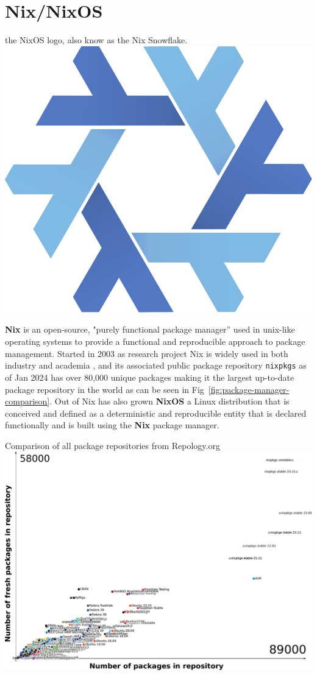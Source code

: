 \section{Nix/NixOS}

\begin{figureBox}[label={fig:nix-snowflake}]{the NixOS logo, also know as the Nix Snowflake.}
  \includegraphics[width=0.2\linewidth]{./background/figures/nix/nix-snowflake.pdf}
\end{figureBox}

\textbf{Nix} \cite{dolstra2004nix} is an open-source, "purely functional package manager” used in unix-like operating systems to provide a functional and reproducible approach to package management. Started in 2003 as research project Nix \cite{dolstra2006purely} is widely used in both industry \cite{NixCommunityNixOSWiki} and academia \cite{10.1145/3152493.3152556} \cite{https://doi.org/10.1002/qua.26872} \cite{LHCbNix}, and its associated public package repository \texttt{nixpkgs} \cite{NixPkgs} as of Jan 2024 has over 80,000 unique packages making it the largest up-to-date package repository in the world as can be seen in Fig~\ref{fig:package-manager-comparison}. Out of Nix has also grown \textbf{NixOS} \cite{10.1145/1411204.1411255} \label{nix-snowflake} a Linux distribution that is conceived and defined as a deterministic and reproducible entity that is declared functionally and is built using the \textbf{Nix} package manager. \\

\begin{figureBox}[label = {fig:package-manager-comparison}]{Comparison of all package repositories from Repology.org \cite{Marakasov_2024}}
  \fontsize{5}{6}\selectfont
  \includegraphics[width=\linewidth]{./background/figures/nix/pkg-compare.pdf}
\end{figureBox}

